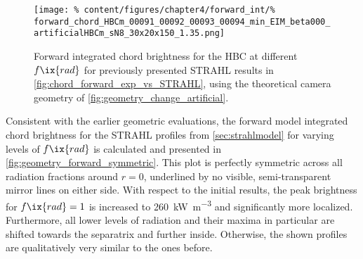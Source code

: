 %
            \begin{figure}[t]%
                \centering%
                \texttt{[image: \%
                    content/figures/chapter4/forward\_int/\%
                    forward\_chord\_HBCm\_00091\_00092\_00093\_00094\_min\_EIM\_beta000\_artificialHBCm\_sN8\_30x20x150\_1.35.png]}%
                \caption{Forward integrated chord brightness for the HBC at different $f\ix{rad}$ for previously presented STRAHL results in \cref{fig:chord_forward_exp_vs_STRAHL}, using the theoretical camera geometry of \cref{fig:geometry_change_artificial}.}\label{fig:forward_intSTRAHL_artificial}%
            \end{figure}%
%
            Consistent with the earlier geometric evaluations, the forward model integrated chord brightness for the STRAHL profiles from \cref{sec:strahlmodel} for varying levels of $f\ix{rad}$ is calculated and presented in \cref{fig:geometry_forward_symmetric}. This plot is perfectly symmetric across all radiation fractions around $r=0$, underlined by no visible, semi-transparent mirror lines on either side. With respect to the initial results, the peak brightness for $f\ix{rad}=1$ is increased to \SI{260}{\kilo\watt\per\cubic\meter} and significantly more localized. Furthermore, all lower levels of radiation and their maxima in particular are shifted towards the separatrix and further inside. Otherwise, the shown profiles are qualitatively very similar to the ones before.\\%
%
